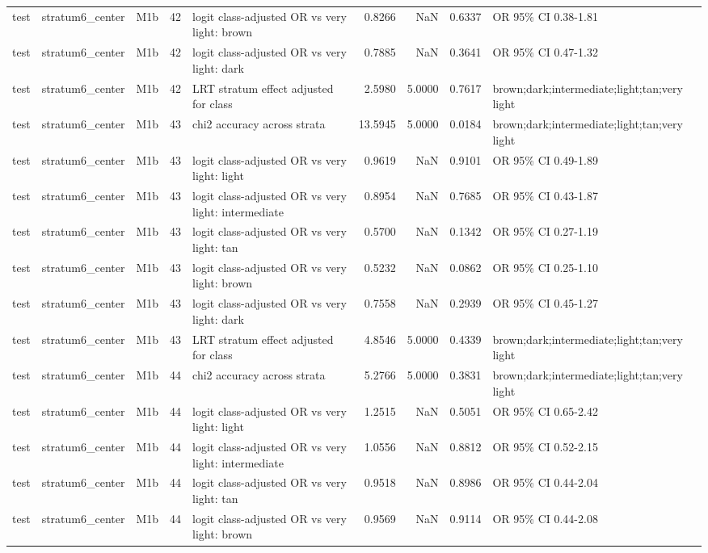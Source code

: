 \begin{tabular}{lllrlrrrl}
test & stratum6\_center & M1b & 42 & logit class-adjusted OR vs very light: brown & 0.8266 & NaN & 0.6337 & OR 95\% CI 0.38-1.81 \\
test & stratum6\_center & M1b & 42 & logit class-adjusted OR vs very light: dark & 0.7885 & NaN & 0.3641 & OR 95\% CI 0.47-1.32 \\
test & stratum6\_center & M1b & 42 & LRT stratum effect adjusted for class & 2.5980 & 5.0000 & 0.7617 & brown;dark;intermediate;light;tan;very light \\
test & stratum6\_center & M1b & 43 & chi2 accuracy across strata & 13.5945 & 5.0000 & 0.0184 & brown;dark;intermediate;light;tan;very light \\
test & stratum6\_center & M1b & 43 & logit class-adjusted OR vs very light: light & 0.9619 & NaN & 0.9101 & OR 95\% CI 0.49-1.89 \\
test & stratum6\_center & M1b & 43 & logit class-adjusted OR vs very light: intermediate & 0.8954 & NaN & 0.7685 & OR 95\% CI 0.43-1.87 \\
test & stratum6\_center & M1b & 43 & logit class-adjusted OR vs very light: tan & 0.5700 & NaN & 0.1342 & OR 95\% CI 0.27-1.19 \\
test & stratum6\_center & M1b & 43 & logit class-adjusted OR vs very light: brown & 0.5232 & NaN & 0.0862 & OR 95\% CI 0.25-1.10 \\
test & stratum6\_center & M1b & 43 & logit class-adjusted OR vs very light: dark & 0.7558 & NaN & 0.2939 & OR 95\% CI 0.45-1.27 \\
test & stratum6\_center & M1b & 43 & LRT stratum effect adjusted for class & 4.8546 & 5.0000 & 0.4339 & brown;dark;intermediate;light;tan;very light \\
test & stratum6\_center & M1b & 44 & chi2 accuracy across strata & 5.2766 & 5.0000 & 0.3831 & brown;dark;intermediate;light;tan;very light \\
test & stratum6\_center & M1b & 44 & logit class-adjusted OR vs very light: light & 1.2515 & NaN & 0.5051 & OR 95\% CI 0.65-2.42 \\
test & stratum6\_center & M1b & 44 & logit class-adjusted OR vs very light: intermediate & 1.0556 & NaN & 0.8812 & OR 95\% CI 0.52-2.15 \\
test & stratum6\_center & M1b & 44 & logit class-adjusted OR vs very light: tan & 0.9518 & NaN & 0.8986 & OR 95\% CI 0.44-2.04 \\
test & stratum6\_center & M1b & 44 & logit class-adjusted OR vs very light: brown & 0.9569 & NaN & 0.9114 & OR 95\% CI 0.44-2.08 \\

\end{tabular}
